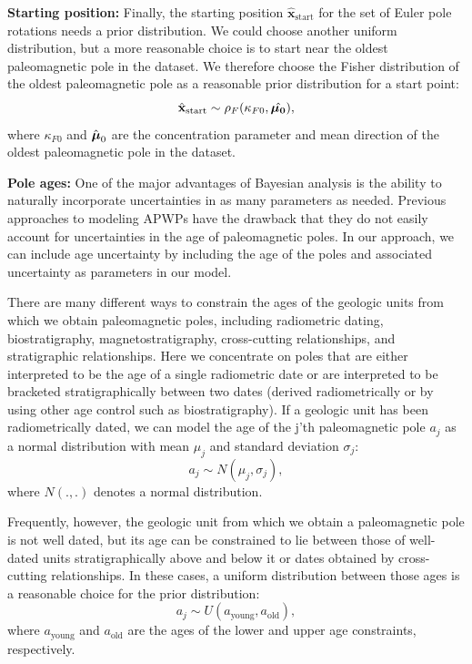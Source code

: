 \documentclass[11pt,letterpaper]{article}
\newcommand{\mitbf}[1]{\hbox{\mathversion{bold}$#1$}}
\begin{document}
\textbf{Starting position:}
Finally, the starting position $\hat{\mathbf{x}}_\mathrm{start}$ for the set of Euler pole rotations needs a prior distribution. We could choose another uniform distribution, but a more reasonable choice is to start near the oldest paleomagnetic pole in the dataset. We therefore choose the Fisher distribution of the oldest paleomagnetic pole as a reasonable prior distribution for a start point:
\begin{equation}
\hat{\mathbf{x}}_\mathrm{start} \sim \rho_F(\kappa_{F0}, \hat{\mitbf{\mu_0}}),
\end{equation}
where $\kappa_{F0}$ and $\hat{\mitbf{\mu}}_0$ are the concentration parameter and mean direction of the oldest paleomagnetic pole in the dataset.

\textbf{Pole ages:}
One of the major advantages of Bayesian analysis is the ability to naturally incorporate uncertainties in as many parameters as needed. Previous approaches to modeling APWPs have the drawback that they do not easily account for uncertainties in the age of paleomagnetic poles. In our approach, we can include age uncertainty by including the age of the poles and associated uncertainty as parameters in our model.

There are many different ways to constrain the ages of the geologic units from which we obtain paleomagnetic poles, including radiometric dating, biostratigraphy, magnetostratigraphy, cross-cutting relationships, and stratigraphic relationships. Here we concentrate on poles that are either interpreted to be the age of a single radiometric date or are interpreted to be bracketed stratigraphically between two dates (derived radiometrically or by using other age control such as biostratigraphy). If a geologic unit has been radiometrically dated, we can model the age of the j'th paleomagnetic pole $a_j$ as a normal distribution with mean $\mu_j$ and standard deviation $\sigma_j$:
\begin{equation}
a_j \sim N(\mu_j, \sigma_j),
\end{equation}
where $N(.,.)$ denotes a normal distribution.

Frequently, however, the geologic unit from which we obtain a paleomagnetic pole is not well dated, but its age can be constrained to lie between those of well-dated units stratigraphically above and below it or dates obtained by cross-cutting relationships. In these cases, a uniform distribution between those ages is a reasonable choice for the prior distribution:
\begin{equation}
a_j \sim U(a_\mathrm{young}, a_\mathrm{old}),
\end{equation}
where $a_\mathrm{young}$ and $a_\mathrm{old}$ are the ages of the lower and upper age constraints, respectively.
\end{document}
